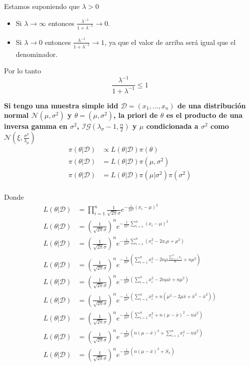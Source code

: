 \documentclass[12pt,]{article}
\providecommand{\tightlist}{%
  \setlength{\itemsep}{0pt}\setlength{\parskip}{0pt}}
\begin{document}
Estamos suponiendo que \(\lambda>0\)

\begin{itemize}
\tightlist
\item
  Si \(\lambda\to \infty\) entonces
  \(\frac{\lambda^{-1}}{1+\lambda^{-1}}\to 0\).
\item
  Si \(\lambda\to 0\) entonces
  \(\frac{\lambda^{-1}}{1+\lambda^{-1}}\to 1\), ya que el valor de
  arriba será igual que el denominador.
\end{itemize}

Por lo tanto \[\frac{\lambda^{-1}}{1+\lambda^{-1}}\le 1\]

\textbf{Si tengo una muestra simple idd \(\mathcal{D}=(x_1,...,x_n)\) de
una distribución normal \(\mathcal{N}(\mu,\sigma^2)\) y
\(\theta=(\mu, \sigma^2)\), la priori de \(\theta\) es el producto de
una inversa gamma en \(\sigma^2\),
\(\mathcal{IG}(\lambda_\sigma-1,\frac{\alpha}{2})\) y \(\mu\)
condicionada a \(\sigma^2\) como
\(\mathcal{N}(\xi,\frac{\sigma^2}{\lambda_\mu})\)} \[
\begin{array}{rl}
\pi(\theta|\mathcal{D}) & \propto L(\theta|\mathcal{D})\pi(\theta)\\
\pi(\theta|\mathcal{D}) & = L(\theta|\mathcal{D})\pi(\mu, \sigma^2)\\
\pi(\theta|\mathcal{D}) & = L(\theta|\mathcal{D})\pi(\mu| \sigma^2)\pi(\sigma^2)\\
\end{array}
\]

Donde \[
\begin{array}{rl}
L(\theta|\mathcal{D})&=\prod_{i=1}^n \frac{1}{\sqrt{2\pi}\sigma}e^{-\frac{1}{2\sigma^2}(x_i-\mu)^2}\\
L(\theta|\mathcal{D})&= \left( \frac{1}{\sqrt{2\pi}\sigma}\right)^ne^{-\frac{1}{2\sigma^2}\sum_{i=1}^n(x_i-\mu)^2}\\
L(\theta|\mathcal{D})&= \left( \frac{1}{\sqrt{2\pi}\sigma}\right)^ne^{-\frac{1}{2\sigma^2}\sum_{i=1}^n(x_i^2-2x_i\mu+\mu^2)}\\
L(\theta|\mathcal{D})&= \left( \frac{1}{\sqrt{2\pi}\sigma}\right)^ne^{-\frac{1}{2\sigma^2}(\sum_{i=1}^n x_i^2-2n\mu\frac{\sum_{i=1}^n
x_i}{n}+n\mu^2)}\\
L(\theta|\mathcal{D})&= \left( \frac{1}{\sqrt{2\pi}\sigma}\right)^ne^{-\frac{1}{2\sigma^2}(\sum_{i=1}^n x_i^2-2n\mu\bar x+n\mu^2)}\\
L(\theta|\mathcal{D})&= \left( \frac{1}{\sqrt{2\pi}\sigma}\right)^ne^{-\frac{1}{2\sigma^2}(\sum_{i=1}^n x_i^2+n(\mu^2-2\mu\bar x+\bar x^2-\bar x^2))}\\
L(\theta|\mathcal{D})&= \left( \frac{1}{\sqrt{2\pi}\sigma}\right)^ne^{-\frac{1}{2\sigma^2}(\sum_{i=1}^n x_i^2+n(\mu-\bar x)^2-n\bar x^2)}\\
L(\theta|\mathcal{D})&= \left( \frac{1}{\sqrt{2\pi}\sigma}\right)^ne^{-\frac{1}{2\sigma^2}(n(\mu-\bar x)^2 + \sum_{i=1}^n x_i^2-n\bar x^2)}\\
L(\theta|\mathcal{D})&= \left( \frac{1}{\sqrt{2\pi}\sigma}\right)^ne^{-\frac{1}{2\sigma^2}(n(\mu-\bar x)^2 + S_x)}
\end{array}
\]
\end{document}
